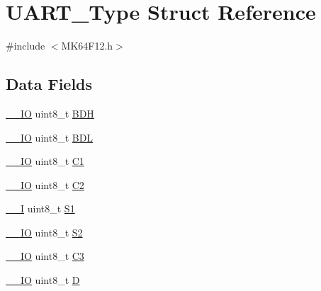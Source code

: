 \hypertarget{struct_u_a_r_t___type}{}\section{U\+A\+R\+T\+\_\+\+Type Struct Reference}
\label{struct_u_a_r_t___type}


{\ttfamily \#include $<$M\+K64\+F12.\+h$>$}

\subsection*{Data Fields}
\begin{DoxyCompactItemize}
\item 
\mbox{\hyperlink{core__cm4_8h_aec43007d9998a0a0e01faede4133d6be}{\+\_\+\+\_\+\+IO}} uint8\+\_\+t \mbox{\hyperlink{group___v_r_e_f___peripheral___access___layer_gaf1f73251625b304407339862ce318059}{B\+DH}}
\item 
\mbox{\hyperlink{core__cm4_8h_aec43007d9998a0a0e01faede4133d6be}{\+\_\+\+\_\+\+IO}} uint8\+\_\+t \mbox{\hyperlink{group___v_r_e_f___peripheral___access___layer_gaca4463c928e7f65eaa324dd97fb6abae}{B\+DL}}
\item 
\mbox{\hyperlink{core__cm4_8h_aec43007d9998a0a0e01faede4133d6be}{\+\_\+\+\_\+\+IO}} uint8\+\_\+t \mbox{\hyperlink{group___v_r_e_f___peripheral___access___layer_gad54aa92be9fc988e74d55d2d3daae8ad}{C1}}
\item 
\mbox{\hyperlink{core__cm4_8h_aec43007d9998a0a0e01faede4133d6be}{\+\_\+\+\_\+\+IO}} uint8\+\_\+t \mbox{\hyperlink{group___v_r_e_f___peripheral___access___layer_ga4f920936a8fc32483b3ebd9b0674b450}{C2}}
\item 
\mbox{\hyperlink{core__cm4_8h_af63697ed9952cc71e1225efe205f6cd3}{\+\_\+\+\_\+I}} uint8\+\_\+t \mbox{\hyperlink{group___v_r_e_f___peripheral___access___layer_gac4e320927bd72445c49414603b05f792}{S1}}
\item 
\mbox{\hyperlink{core__cm4_8h_aec43007d9998a0a0e01faede4133d6be}{\+\_\+\+\_\+\+IO}} uint8\+\_\+t \mbox{\hyperlink{group___v_r_e_f___peripheral___access___layer_gaafdaf251d5cfeb18803536542a880459}{S2}}
\item 
\mbox{\hyperlink{core__cm4_8h_aec43007d9998a0a0e01faede4133d6be}{\+\_\+\+\_\+\+IO}} uint8\+\_\+t \mbox{\hyperlink{group___v_r_e_f___peripheral___access___layer_ga6533a725e5ee4892879f0b6d9dd6675a}{C3}}
\item 
\mbox{\hyperlink{core__cm4_8h_aec43007d9998a0a0e01faede4133d6be}{\+\_\+\+\_\+\+IO}} uint8\+\_\+t \mbox{\hyperlink{group___v_r_e_f___peripheral___access___layer_ga6c0edcafd91c3baa698617799de6ec35}{D}}

\end{DoxyCompactItemize}
